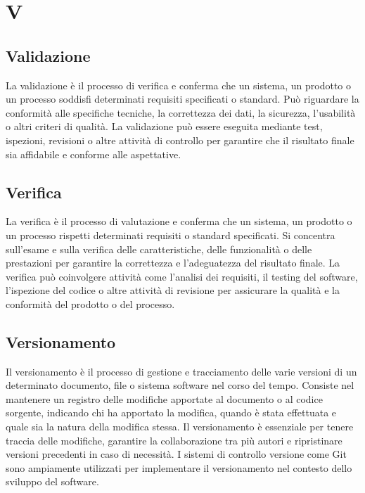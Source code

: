 \section{V}

\vspace{2em}
\subsection*{Validazione}
La validazione è il processo di verifica e conferma che un sistema, un prodotto o un processo soddisfi determinati requisiti specificati o standard. Può riguardare la conformità alle specifiche tecniche, la correttezza dei dati, la sicurezza, l'usabilità o altri criteri di qualità. La validazione può essere eseguita mediante test, ispezioni, revisioni o altre attività di controllo per garantire che il risultato finale sia affidabile e conforme alle aspettative.

\vspace{2em}
\subsection*{Verifica}
La verifica è il processo di valutazione e conferma che un sistema, un prodotto o un processo rispetti determinati requisiti o standard specificati. Si concentra sull'esame e sulla verifica delle caratteristiche, delle funzionalità o delle prestazioni per garantire la correttezza e l'adeguatezza del risultato finale. La verifica può coinvolgere attività come l'analisi dei requisiti, il testing del software, l'ispezione del codice o altre attività di revisione per assicurare la qualità e la conformità del prodotto o del processo.

\vspace{2em}
\subsection*{Versionamento}
Il versionamento è il processo di gestione e tracciamento delle varie versioni di un determinato documento, file o sistema software nel corso del tempo. Consiste nel mantenere un registro delle modifiche apportate al documento o al codice sorgente, indicando chi ha apportato la modifica, quando è stata effettuata e quale sia la natura della modifica stessa. Il versionamento è essenziale per tenere traccia delle modifiche, garantire la collaborazione tra più autori e ripristinare versioni precedenti in caso di necessità. I sistemi di controllo versione come Git sono ampiamente utilizzati per implementare il versionamento nel contesto dello sviluppo del software.

